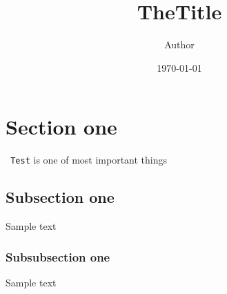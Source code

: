 \documentclass[12pt,a4paper]{article}
\title{TheTitle}
\author{Author}
\date{\today}
\newcommand{\code}[1]{\colorbox{backcolour}{\normalsize\texttt{ #1} }}
\begin{document}
\maketitle

\section{Section one}
\code{Test} is one of most important things

\subsection{Subsection one}
Sample text

\subsubsection{Subsubsection one}
Sample text
\end{document}
